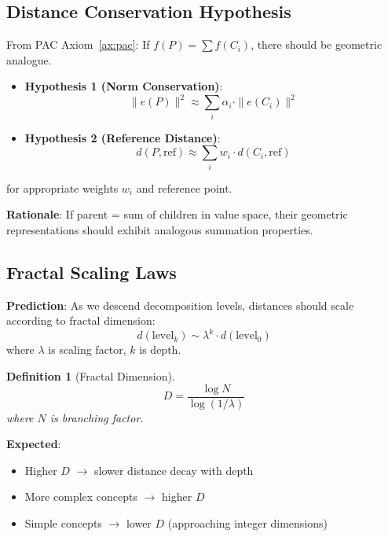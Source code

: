 \documentclass[11pt,a4paper]{article}
\newtheorem{definition}{Definition}
\newcommand{\norm}[1]{\|#1\|}
\begin{document}
\subsection{Distance Conservation Hypothesis}

From PAC Axiom~\ref{ax:pac}: If $f(P) = \sum f(C_i)$, there should be geometric analogue.

\begin{itemize}
    \item \textbf{Hypothesis 1 (Norm Conservation)}:
    \begin{equation}
    \norm{e(P)}^2 \approx \sum_i \alpha_i \cdot \norm{e(C_i)}^2
    \end{equation}
    
    \item \textbf{Hypothesis 2 (Reference Distance)}:
    \begin{equation}
    d(P, \text{ref}) \approx \sum_i w_i \cdot d(C_i, \text{ref})
    \end{equation}
\end{itemize}

for appropriate weights $w_i$ and reference point.

\textbf{Rationale}: If parent = sum of children in value space, their geometric representations should exhibit analogous summation properties.

\subsection{Fractal Scaling Laws}

\textbf{Prediction}: As we descend decomposition levels, distances should scale according to fractal dimension:
\begin{equation}
d(\text{level}_k) \sim \lambda^k \cdot d(\text{level}_0)
\end{equation}
where $\lambda$ is scaling factor, $k$ is depth.

\begin{definition}[Fractal Dimension]
\begin{equation}
D = \frac{\log N}{\log(1/\lambda)}
\end{equation}
where $N$ is branching factor.
\end{definition}

\textbf{Expected}:
\begin{itemize}
    \item Higher $D$ $\to$ slower distance decay with depth
    \item More complex concepts $\to$ higher $D$
    \item Simple concepts $\to$ lower $D$ (approaching integer dimensions)
\end{itemize}
\end{document}
